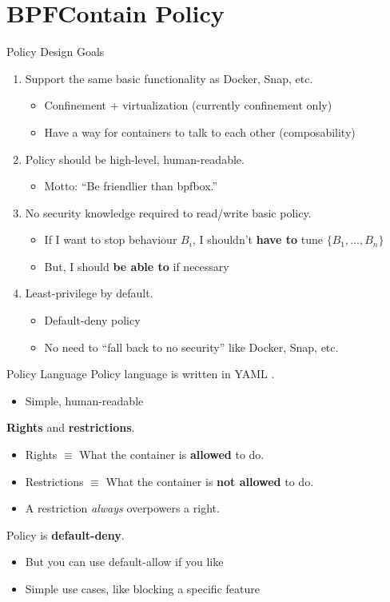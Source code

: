 \documentclass[12pt, dvipsnames, aspectratio=169]{beamer}
\newcommand{\blue}[1]{{\color{blue}#1}}
\newcommand{\orange}[1]{{\color{orange}#1}}
\newcommand{\green}[1]{{\color{green}#1}}
\begin{document}
\section{BPFContain Policy}

\begin{frame}[c]{Policy Design Goals}
\vfill
\begin{enumerate}
  \item Support the same basic functionality as Docker, Snap, etc.
  \begin{itemize}
    \item \blue{Confinement} + \orange{virtualization} (currently \blue{confinement} only)
    \item Have a way for containers to talk to each other (\green{composability})
  \end{itemize}
  \vfill
  \item Policy should be high-level, human-readable.
  \begin{itemize}
    \item Motto: \enquote{Be friendlier than bpfbox.}
  \end{itemize}
  \vfill
  \item No security knowledge required to read/write basic policy.
  \begin{itemize}
    \item If I want to stop behaviour $B_i$, I shouldn't \textbf{have to} tune $\{B_1,...,B_n\}$
    \item But, I should \textbf{be able to} if necessary
  \end{itemize}
  \vfill
  \item Least-privilege by default.
  \begin{itemize}
    \item Default-deny policy
    \item No need to \enquote{fall back to no security} like Docker, Snap, etc.
  \end{itemize}
\end{enumerate}
\vfill
\end{frame}

\begin{frame}[c]{Policy Language}
Policy language is written in YAML \cite{yaml}.
\begin{itemize}
  \item Simple, human-readable
\end{itemize}
\vfill
\textbf{Rights} and \textbf{restrictions}.
\begin{itemize}
  \item Rights $\equiv$ What the container is \textbf{allowed} to do.
  \item Restrictions $\equiv$ What the container is \textbf{not allowed} to do.
  \item A restriction \textit{always} overpowers a right.
\end{itemize}
\vfill
Policy is \textbf{default-deny}.
\begin{itemize}
  \item But you can use default-allow if you like
  \item Simple use cases, like blocking a specific feature
\end{itemize}
\end{frame}
\end{document}

